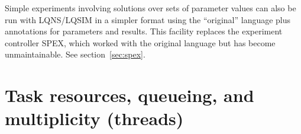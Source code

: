 \documentclass[11pt]{article}
\begin{document}
Simple experiments involving solutions over sets of parameter values can also be run with
LQNS/LQSIM in a simpler format using the ``original'' language plus annotations for parameters
and results. This facility replaces the experiment controller SPEX, which worked with the original
language but has become unmaintainable. See section~\ref{sec:spex}.




\section{Task resources, queueing, and multiplicity (threads)}
\label{sec:tasks}
\end{document}
